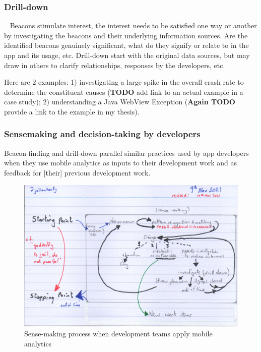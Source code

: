 

\subsubsection{Drill-down}~\label{drill-down-research-method}
Beacons stimulate interest, the interest needs to be satisfied one way or another by investigating the beacons and their underlying information sources. 
Are the identified beacons genuinely significant, what do they signify or relate to in the app and its usage, etc.  Drill-down start with the original data sources, but may draw in others to clarify relationships, responses by the developers, etc.

 

Here are 2 examples: 1) investigating a large spike in the overall crash rate to determine the constituent causes (\textbf{TODO} add link to an actual example in a case study); 2) understanding a Java WebView Exception (\textbf{Again TODO} provide a link to the example in my thesis). 


\subsubsection{Sensemaking and decision-taking by developers}
Beacon-finding and drill-down parallel similar practices used by app developers when they use mobile analytics as inputs to their development work and as feedback for [their] previous development work.

\begin{figure}
    \centering
    \includegraphics[width=15cm]{images/rough-sketches/practical-sense-making-process-10-nov-2021.jpeg}
    \caption{Sense-making process when development teams apply mobile analytics}
    \label{fig:practical-sense-making-process-when-dev-teams-apply-mobile-analytics}
\end{figure}


